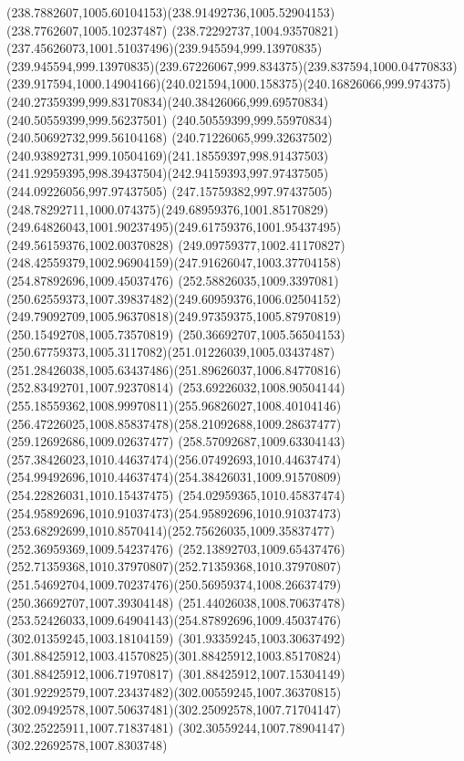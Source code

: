 {{\curveto(238.7882607,1005.60104153)(238.91492736,1005.52904153)(238.7762607,1005.10237487)
\curveto(238.72292737,1004.93570821)(237.45626073,1001.51037496)(239.945594,999.13970835)
\curveto(239.945594,999.13970835)(239.67226067,999.834375)(239.837594,1000.04770833)
\curveto(239.917594,1000.14904166)(240.021594,1000.158375)(240.16826066,999.974375)
\curveto(240.27359399,999.83170834)(240.38426066,999.69570834)(240.50559399,999.56237501)
\lineto(240.50559399,999.55970834)
\lineto(240.50692732,999.56104168)
\curveto(240.71226065,999.32637502)(240.93892731,999.10504169)(241.18559397,998.91437503)
\curveto(241.92959395,998.39437504)(242.94159393,997.97437505)(244.09226056,997.97437505)
\curveto(247.15759382,997.97437505)(248.78292711,1000.074375)(249.68959376,1001.85170829)
\curveto(249.64826043,1001.90237495)(249.61759376,1001.95437495)(249.56159376,1002.00370828)
\curveto(249.09759377,1002.41170827)(248.42559379,1002.96904159)(247.91626047,1003.37704158)
\moveto(254.87892696,1009.45037476)
\curveto(252.58826035,1009.3397081)(250.62559373,1007.39837482)(249.60959376,1006.02504152)
\curveto(249.79092709,1005.96370818)(249.97359375,1005.87970819)(250.15492708,1005.73570819)
\curveto(250.36692707,1005.56504153)(250.67759373,1005.3117082)(251.01226039,1005.03437487)
\curveto(251.28426038,1005.63437486)(251.89626037,1006.84770816)(252.83492701,1007.92370814)
\curveto(253.69226032,1008.90504144)(255.18559362,1008.99970811)(255.96826027,1008.40104146)
\curveto(256.47226025,1008.85837478)(258.21092688,1009.28637477)(259.12692686,1009.02637477)
\curveto(258.57092687,1009.63304143)(257.38426023,1010.44637474)(256.07492693,1010.44637474)
\curveto(254.99492696,1010.44637474)(254.38426031,1009.91570809)(254.22826031,1010.15437475)
\curveto(254.02959365,1010.45837474)(254.95892696,1010.91037473)(254.95892696,1010.91037473)
\curveto(253.68292699,1010.8570414)(252.75626035,1009.35837477)(252.36959369,1009.54237476)
\curveto(252.13892703,1009.65437476)(252.71359368,1010.37970807)(252.71359368,1010.37970807)
\curveto(251.54692704,1009.70237476)(250.56959374,1008.26637479)(250.36692707,1007.39304148)
\curveto(251.44026038,1008.70637478)(253.52426033,1009.64904143)(254.87892696,1009.45037476)
\moveto(302.01359245,1003.18104159)
\curveto(301.93359245,1003.30637492)(301.88425912,1003.41570825)(301.88425912,1003.85170824)
\lineto(301.88425912,1006.71970817)
\curveto(301.88425912,1007.15304149)(301.92292579,1007.23437482)(302.00559245,1007.36370815)
\curveto(302.09492578,1007.50637481)(302.25092578,1007.71704147)(302.25225911,1007.71837481)
\lineto(302.30559244,1007.78904147)
\lineto(302.22692578,1007.8303748)
}}
